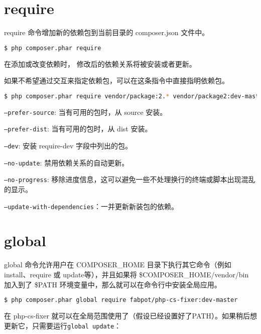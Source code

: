 \section{require}

require 命令增加新的依赖包到当前目录的 composer.json 文件中。

\begin{lstlisting}[language=bash]
$ php composer.phar require
\end{lstlisting}

在添加或改变依赖时， 修改后的依赖关系将被安装或者更新。

如果不希望通过交互来指定依赖包，可以在这条指令中直接指明依赖包。

\begin{lstlisting}[language=bash]
$ php composer.phar require vendor/package:2.* vendor/package2:dev-master
\end{lstlisting}

\begin{compactitem}
\item \texttt{--prefer-source}: 当有可用的包时，从 source 安装。
\item \texttt{--prefer-dist}: 当有可用的包时，从 dist 安装。
\item \texttt{--dev}: 安装 require-dev 字段中列出的包。
\item \texttt{--no-update}: 禁用依赖关系的自动更新。
\item \texttt{--no-progress}: 移除进度信息，这可以避免一些不处理换行的终端或脚本出现混乱的显示。
\item \texttt{--update-with-dependencies}：一并更新新装包的依赖。
\end{compactitem}

\section{global}

global 命令允许用户在 COMPOSER\_HOME 目录下执行其它命令（例如install、require 或 update等），并且如果将 \$COMPOSER\_HOME/vendor/bin 加入到了 \$PATH 环境变量中，那么就可以在命令行中安装全局应用。

\begin{lstlisting}[language=bash]
$ php composer.phar global require fabpot/php-cs-fixer:dev-master
\end{lstlisting}

在 php-cs-fixer 就可以在全局范围使用了（假设已经设置好了PATH）。如果稍后想更新它，只需要运行\texttt{global update}：

